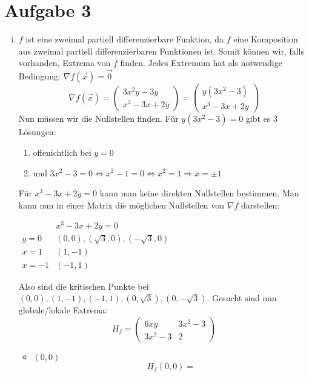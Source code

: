 \documentclass[10pt,a4paper,parskip=half]{scrartcl}
\begin{document}
\section*{Aufgabe 3}
\begin{enumerate}[(i)]
	\item 	\(f\) ist eine zweimal partiell differenzierbare Funktion, da \(f\) eine Komposition aus zweimal partiell differenzierbaren Funktionen ist. Somit können wir, falls vorhanden, Extrema von $f$ finden. Jedes Extremum hat als notwendige Bedingung: $\nabla f(\vec x) = \vec 0$
	\[ \nabla f (\vec x) = 
	\begin{pmatrix}
		3x^2y - 3y \\
		x^3 - 3x + 2y 
	\end{pmatrix} =  
	\begin{pmatrix}
		y(3x^2 - 3) \\
		x^3 - 3x + 2y 
	\end{pmatrix}  \]
Nun müssen wir die Nullstellen finden.
Für \( y(3x^2 -3) = 0 \) gibt es 3 Lösungen:
\begin{enumerate}
	\item offenichtlich bei $y = 0$
	\item  und \(3x^2 - 3 = 0 \Leftrightarrow x^2 - 1 = 0 \Leftrightarrow x^2 = 1 \Rightarrow x = \pm 1\)
\end{enumerate}
Für \( x^3 - 3x + 2y  = 0 \) kann man keine direkten Nullstellen bestimmen.
Man kann nun in einer Matrix die möglichen Nullstellen von $\nabla f$ darstellen: \\
\begin{center}
\begin{math}
	\begin{array}{c|cc}
	 & x^3 - 3x + 2y  = 0  \\
	 \hline
	 y = 0 & (0,0),(\sqrt{3},0),(-\sqrt{3},0)\\
	 x = 1 & (1,-1)\\
	 x = -1 & (-1,1)
	\end{array}
\end{math}
\end{center}
Also sind die kritischen Punkte bei $(0,0), (1,-1),(-1,1),(0,\sqrt{3}),(0,-\sqrt{3})$. Gesucht sind nun globale/lokale Extrema:
	\[H_f = 
	\begin{pmatrix}
		6xy & 3x^2 - 3 \\
		3x^2 - 3 & 2	
	\end{pmatrix} \]
	\begin{itemize}
		\item 	$(0,0)$
			\[H_f(0,0) = 
\]
\end{itemize}
\end{enumerate}
\end{document}
